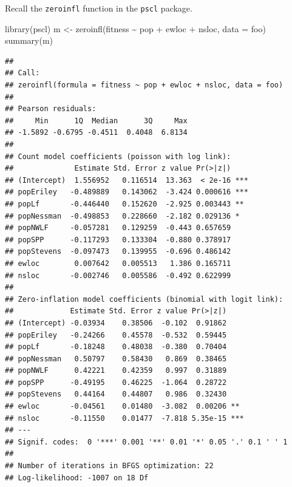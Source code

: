 \documentclass[
  ignorenonframetext,
]{beamer}
\newenvironment{Shaded}{\begin{snugshade}}{\end{snugshade}}
\newcommand{\AttributeTok}[1]{\textcolor[rgb]{0.77,0.63,0.00}{#1}}
\newcommand{\FunctionTok}[1]{\textcolor[rgb]{0.00,0.00,0.00}{#1}}
\newcommand{\NormalTok}[1]{#1}
\newcommand{\OtherTok}[1]{\textcolor[rgb]{0.56,0.35,0.01}{#1}}
\newcommand{\SpecialCharTok}[1]{\textcolor[rgb]{0.00,0.00,0.00}{#1}}
\begin{document}
\begin{frame}[fragile]{}
\protect\hypertarget{section-44}{}
Recall the \texttt{zeroinfl} function in the \texttt{pscl} package.

\vspace{12pt}
\tiny

\begin{Shaded}
\begin{Highlighting}[]
\FunctionTok{library}\NormalTok{(pscl)}
\NormalTok{m }\OtherTok{\textless{}{-}} \FunctionTok{zeroinfl}\NormalTok{(fitness }\SpecialCharTok{\textasciitilde{}}\NormalTok{ pop }\SpecialCharTok{+}\NormalTok{ ewloc }\SpecialCharTok{+}\NormalTok{ nsloc, }\AttributeTok{data =}\NormalTok{ foo)}
\FunctionTok{summary}\NormalTok{(m)}
\end{Highlighting}
\end{Shaded}

\begin{verbatim}
## 
## Call:
## zeroinfl(formula = fitness ~ pop + ewloc + nsloc, data = foo)
## 
## Pearson residuals:
##     Min      1Q  Median      3Q     Max 
## -1.5892 -0.6795 -0.4511  0.4048  6.8134 
## 
## Count model coefficients (poisson with log link):
##              Estimate Std. Error z value Pr(>|z|)    
## (Intercept)  1.556952   0.116514  13.363  < 2e-16 ***
## popEriley   -0.489889   0.143062  -3.424 0.000616 ***
## popLf       -0.446440   0.152620  -2.925 0.003443 ** 
## popNessman  -0.498853   0.228660  -2.182 0.029136 *  
## popNWLF     -0.057281   0.129259  -0.443 0.657659    
## popSPP      -0.117293   0.133304  -0.880 0.378917    
## popStevens  -0.097473   0.139955  -0.696 0.486142    
## ewloc        0.007642   0.005513   1.386 0.165711    
## nsloc       -0.002746   0.005586  -0.492 0.622999    
## 
## Zero-inflation model coefficients (binomial with logit link):
##             Estimate Std. Error z value Pr(>|z|)    
## (Intercept) -0.03934    0.38506  -0.102  0.91862    
## popEriley   -0.24266    0.45578  -0.532  0.59445    
## popLf       -0.18248    0.48038  -0.380  0.70404    
## popNessman   0.50797    0.58430   0.869  0.38465    
## popNWLF      0.42221    0.42359   0.997  0.31889    
## popSPP      -0.49195    0.46225  -1.064  0.28722    
## popStevens   0.44164    0.44807   0.986  0.32430    
## ewloc       -0.04561    0.01480  -3.082  0.00206 ** 
## nsloc       -0.11550    0.01477  -7.818 5.35e-15 ***
## ---
## Signif. codes:  0 '***' 0.001 '**' 0.01 '*' 0.05 '.' 0.1 ' ' 1 
## 
## Number of iterations in BFGS optimization: 22 
## Log-likelihood: -1007 on 18 Df
\end{verbatim}
\end{frame}
\end{document}
